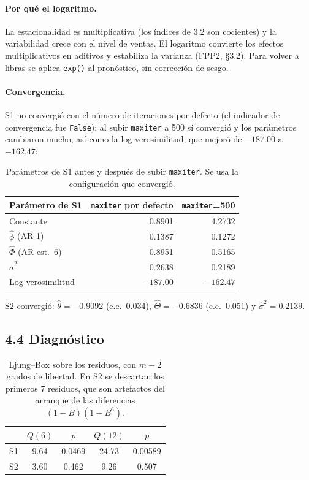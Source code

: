 \documentclass[11pt]{article}
\begin{document}
\paragraph{Por qu\'e el logaritmo.} La estacionalidad es multiplicativa (los
\'indices de 3.2 son cocientes) y la variabilidad crece con el nivel de ventas.
El logaritmo convierte los efectos multiplicativos en aditivos y estabiliza la
varianza (FPP2, \S3.2). Para volver a libras se aplica \texttt{exp()} al
pron\'ostico, sin correcci\'on de sesgo.

\paragraph{Convergencia.} S1 no convergi\'o con el n\'umero de iteraciones
por defecto (el indicador de convergencia fue \texttt{False}); al subir
\texttt{maxiter} a 500 s\'i convergi\'o y los par\'ametros cambiaron mucho, as\'i
como la log-verosimilitud, que mejor\'o de $-187.00$ a $-162.47$:

\begin{table}[H]
\centering
\begin{tabular}{l|r|r}
\hline
Par\'ametro de S1 & \texttt{maxiter} por defecto & \texttt{maxiter}=500 \\
\hline
Constante          & 0.8901 & 4.2732 \\
$\hat\phi$ (AR 1)   & 0.1387 & 0.1272 \\
$\hat\Phi$ (AR est.\ 6) & 0.8951 & 0.5165 \\
$\hat\sigma^2$     & 0.2638 & 0.2189 \\
\hline
Log-verosimilitud  & $-187.00$ & $-162.47$ \\
\hline
\end{tabular}
\caption{Par\'ametros de S1 antes y despu\'es de subir \texttt{maxiter}. Se
usa la configuraci\'on que convergi\'o.}
\label{tab:s1}
\end{table}

S2 convergi\'o: $\hat\theta=-0.9092$ (e.e.\ 0.034), $\hat\Theta=-0.6836$ (e.e.\
0.051) y $\hat\sigma^2=0.2139$.

\subsection*{4.4 Diagn\'ostico}

\begin{table}[H]
\centering
\begin{tabular}{l|cc|cc}
\hline
 & $Q(6)$ & $p$ & $Q(12)$ & $p$ \\
\hline
S1 & 9.64 & 0.0469 & 24.73 & 0.00589 \\
S2 & 3.60 & 0.462  &  9.26 & 0.507 \\
\hline
\end{tabular}
\caption{Ljung--Box sobre los residuos, con $m-2$ grados de libertad. En S2 se
descartan los primeros 7 residuos, que son artefactos del arranque de las
diferencias $(1-B)(1-B^6)$.}
\label{tab:diag}
\end{table}
\end{document}
